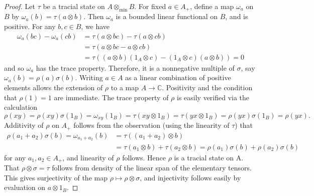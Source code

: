 \documentclass[10pt,a4paper]{amsart}
\newcommand{\om}{\omega}
\newcommand{\sm}{\sigma}
\begin{document}
\begin{proof}
Let $\tau$ be a tracial state on $A \otimes_{\min} B$.
For fixed $a \in A_{+}$, define a map $\om_{a}$ on
$B$ by $\om_{a} (b) = \tau (a \otimes b)$.
Then
$\om_{a}$ is a bounded linear functional on $B$,
and is positive.
For any $b,c \in B$, we have
%
\begin{align*}
\om_{a} (bc) - \om_{a}(cb) &= \tau (a \otimes bc) -
\tau (a \otimes cb) \\
&= \tau (a \otimes bc - a \otimes cb) \\
&= \tau ( (a \otimes b) (1_{A} \otimes c) -
(1_{A} \otimes c) (a \otimes b) ) = 0
\end{align*}
%
and so $\om_{a}$ has the trace property.
Therefore,
it is a nonnegative multiple of $\sm$, say
$\om_{a} (b) = \rho (a) \sm (b)$.
Writing
$a \in A$ as a linear combination of positive
elements allows the extension of $\rho$ to a map
$A \to {\mathbb{C}}$.
Positivity and the condition
that $\rho (1) = 1$ are immediate.
The trace
property of $\rho$ is easily verified via the
calculation
%
\[
\rho (xy) = \rho(xy) \sm (1_{B}) = \om_{xy}(1_{B})
= \tau (xy \otimes 1_{B}) = \tau (yx \otimes 1_{B})
= \rho (yx) \sm(1_{B}) = \rho (yx).
\]
%
Additivity of $\rho$ on $A_{+}$ follows from the
observation (using the linearity of $\tau$) that
%
\begin{align*}
\rho (a_{1} + a_{2}) \sm (b)
= \om_{a_{1} + a_{2}} (b)
&= \tau ((a_{1} + a_{2}) \otimes b) \\
&= \tau (a_{1} \otimes b) + \tau (a_{2} \otimes b)
= \rho (a_{1}) \sm (b) + \rho (a_{2}) \sm (b)
\end{align*}
%
for any $a_{1}, a_{2} \in A_{+}$, and linearity
of $\rho$ follows.
Hence $\rho$ is a tracial state
on A.
That $\rho \otimes \sm = \tau$ follows from
density of the linear span of the elementary tensors.
This gives surjectivity of the map
$\rho \mapsto \rho \otimes \sm$,
and injectivity follows easily by evaluation on
$a \otimes 1_{B}$.
\end{proof}
\end{document}
